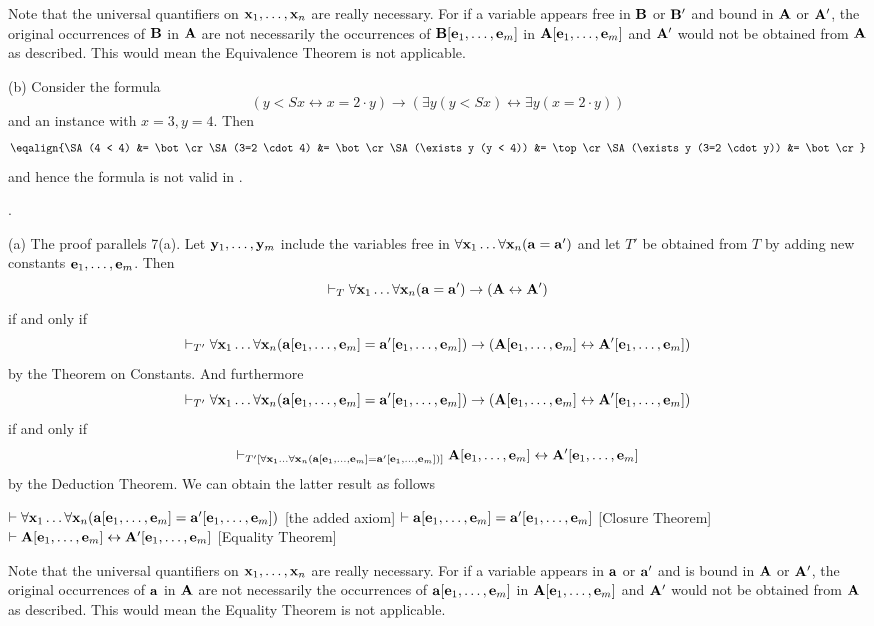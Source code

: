 Note that the universal quantifiers on ${\bf x}_1, \dots, {\bf x}_n$ are really necessary. For if a variable
appears free in ${\bf B}$ or ${\bf B}'$ and bound in ${\bf A}$ or ${\bf A}'$, the original occurrences of ${\bf B}$ in ${\bf A}$
are not necessarily the occurrences of ${\bf B}[{\bf e}_1, \dots, {\bf e}_m]$ in ${\bf A}[{\bf e}_1, \dots, {\bf e}_m]$ and ${\bf A}'$ 
would not be obtained from ${\bf A}$ as described. This would mean the Equivalence Theorem is not applicable.

\smallskip

\ansitem (b) Consider the formula
$$
(y<Sx \leftrightarrow x=2 \cdot y) \to (\exists y(y<Sx) \leftrightarrow \exists y (x=2 \cdot y))
$$
and an instance with $x=3, y=4$. Then
$$\eqalign{\SA(4 < 4) &= \bot\cr
\SA(3=2 \cdot 4) &= \bot\cr
\SA(\exists y (y < 4)) &= \top\cr
\SA(\exists y (3=2 \cdot y)) &= \bot\cr
}$$
and hence the formula is not valid in \N.

\medskip

.

\ansitem (a) The proof parallels 7(a). Let ${\bf y}_1, \dots, {\bf y}_m$ include the variables 
free in $\forall{\bf x}_1 \dots \forall{\bf x}_n ({\bf a} = {\bf a}')$ and let $T'$ be obtained from $T$ 
by adding new constants ${\bf e}_1, \dots, {\bf e}_m$. Then 
$$
\vdash_T \forall{\bf x}_1 \dots \forall{\bf x}_n ({\bf a} = {\bf a}') \to ({\bf A} \leftrightarrow {\bf A}')
$$
if and only if 
$$
\vdash_{T'} \forall{\bf x}_1 \dots \forall{\bf x}_n ({\bf a}[{\bf e}_1, \dots, {\bf e}_m] = {\bf a}'[{\bf e}_1, \dots, {\bf e}_m]) \to ({\bf A}[{\bf e}_1, \dots, {\bf e}_m] \leftrightarrow {\bf A}'[{\bf e}_1, \dots, {\bf e}_m])
$$
by the Theorem on Constants. And furthermore
$$
\vdash_{T'} \forall{\bf x}_1 \dots \forall{\bf x}_n ({\bf a}[{\bf e}_1, \dots, {\bf e}_m] = {\bf a}'[{\bf e}_1, \dots, {\bf e}_m]) \to ({\bf A}[{\bf e}_1, \dots, {\bf e}_m] \leftrightarrow {\bf A}'[{\bf e}_1, \dots, {\bf e}_m])
$$
if and only if
$$
\vdash_{T'[\forall{\bf x}_1 \dots \forall{\bf x}_n ({\bf a}[{\bf e}_1, \dots, {\bf e}_m] = {\bf a}'[{\bf e}_1, \dots, {\bf e}_m])]} {\bf A}[{\bf e}_1, \dots, {\bf e}_m] \leftrightarrow {\bf A}'[{\bf e}_1, \dots, {\bf e}_m]
$$
by the Deduction Theorem. We can obtain the latter result as follows

\itemitem{} $\vdash \forall{\bf x}_1 \dots \forall{\bf x}_n ({\bf a}[{\bf e}_1, \dots, {\bf e}_m] = {\bf a}'[{\bf e}_1, \dots, {\bf e}_m])$ \hfill [the added axiom]
\itemitem{} $\vdash {\bf a}[{\bf e}_1, \dots, {\bf e}_m] = {\bf a}'[{\bf e}_1, \dots, {\bf e}_m]$ \hfill [Closure Theorem]
\itemitem{} $\vdash {\bf A}[{\bf e}_1, \dots, {\bf e}_m] \leftrightarrow {\bf A}'[{\bf e}_1, \dots, {\bf e}_m]$ \hfill [Equality Theorem]

Note that the universal quantifiers on ${\bf x}_1, \dots, {\bf x}_n$ are really necessary. For if a variable
appears in ${\bf a}$ or ${\bf a}'$ and is bound in ${\bf A}$ or ${\bf A}'$, the original occurrences of ${\bf a}$ in ${\bf A}$
are not necessarily the occurrences of ${\bf a}[{\bf e}_1, \dots, {\bf e}_m]$ in ${\bf A}[{\bf e}_1, \dots, {\bf e}_m]$ and ${\bf A}'$ 
would not be obtained from ${\bf A}$ as described. This would mean the Equality Theorem is not applicable.

